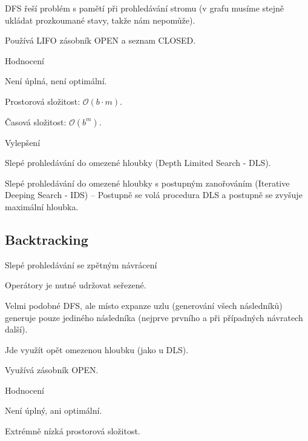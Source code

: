 \begin{compactitem}
    \item DFS řeší problém s pamětí při prohledávání stromu (v grafu musíme stejně ukládat prozkoumané stavy, takže nám nepomůže).
    \item Používá LIFO zásobník OPEN a seznam CLOSED.

    \item Hodnocení \begin{compactitem}
        \item Není úplná, není optimální.
        \item Prostorová složitost: $\mathcal{O}(b \cdot m)$.
        \item Časová složitost: $\mathcal{O}(b^m)$.
    \end{compactitem}

    \item Vylepšení \begin{compactitem}
        \item Slepé prohledávání do omezené hloubky (Depth Limited Search - DLS).
        \item Slepé prohledávání do omezené hloubky s postupným zanořováním (Iterative Deeping Search - IDS) -- Postupně se volá procedura DLS a postupně se zvyšuje maximální hloubka.
    \end{compactitem}
\end{compactitem}

\subsection{Backtracking}

\begin{compactitem}
    \item Slepé prohledávání se zpětným návrácení \begin{compactitem}
        \item Operátory je nutné udržovat seřezené.
        \item Velmi podobné DFS, ale místo expanze uzlu (generování všech následníků) generuje pouze jediného následníka (nejprve prvního a při případných návratech další).
        \item Jde využít opět omezenou hloubku (jako u DLS).
    \end{compactitem}

    \item Využívá zásobník OPEN.

    \item Hodnocení \begin{compactitem}
        \item Není úplný, ani optimální.
        \item Extrémně nízká prostorová složitost.
    \end{compactitem}
\end{compactitem}

